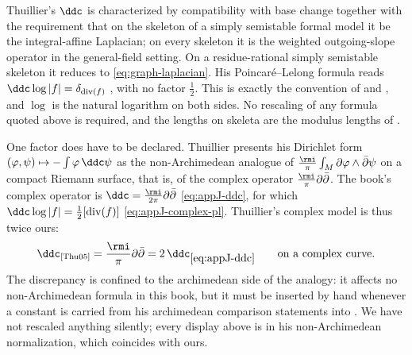 \begin{remark}
\label{rem:ch25-thuillier-normalization}
Thuillier's $\ddc$ is characterized by compatibility with base change
together with the requirement that on the skeleton of a simply semistable
formal model it be the integral-affine Laplacian; on every skeleton it is
the weighted outgoing-slope operator in the general-field setting.
On a residue-rational simply semistable skeleton it reduces to
\eqref{eq:graph-laplacian}.  His Poincar\'e--Lelong formula reads
$\ddc\log|f|=\delta_{\operatorname{div}(f)}$
\cite[Proposition~3.3.15]{Thu05}, with no factor $\tfrac12$.  This is
exactly the convention of  and
, and $\log$ is the natural logarithm on both
sides.  No rescaling of any formula quoted above is required, and the
lengths on skeleta are the modulus lengths of
.

One factor does have to be declared.  Thuillier presents his Dirichlet form
$(\varphi,\psi)\mapsto-\int\varphi\,\ddc\psi$ as the non-Archimedean
analogue of
$\frac{\rmi}{\pi}\int_M\partial\varphi\wedge\bar\partial\psi$
on a compact Riemann surface, that is, of the complex operator
$\frac{\rmi}{\pi}\partial\bar\partial$.  The book's complex operator is
$\ddc=\frac{\rmi}{2\pi}\partial\bar\partial$ \eqref{eq:appJ-ddc}, for which
$\ddc\log|f|=\tfrac12[\operatorname{div}(f)]$
\eqref{eq:appJ-complex-pl}.  Thuillier's complex model is thus twice ours:
\[
 \ddc_{\text{\cite{Thu05}}}
 =\frac{\rmi}{\pi}\partial\bar\partial
 =2\,\ddc_{\eqref{eq:appJ-ddc}}
 \qquad\text{on a complex curve.}
\]
The discrepancy is confined to the archimedean side of the analogy: it
affects no non-Archimedean formula in this book, but it must be inserted by
hand whenever a constant is carried from his archimedean comparison
statements into .  We have not rescaled anything
silently; every display above is in his non-Archimedean normalization, which
coincides with ours.
\end{remark}

